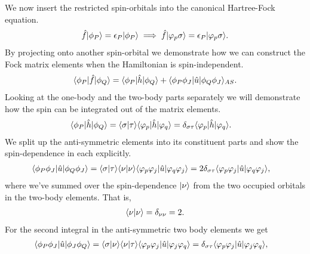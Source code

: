             We now insert the restricted spin-orbitals into the canonical
            Hartree-Fock equation.
            \begin{align}
                \hat{f}| \phi_P \rangle = \epsilon_P| \phi_P \rangle
                \implies
                \hat{f}| \varphi_p\sigma \rangle
                = \epsilon_P| \varphi_p\sigma \rangle.
            \end{align}
            By projecting onto another spin-orbital we demonstrate how we can
            construct the Fock matrix elements when the Hamiltonian is
            spin-independent.
            \begin{align}
                \langle \phi_P |\hat{f}| \phi_Q \rangle
                = \langle \phi_P |\hat{h}| \phi_Q \rangle
                + \langle \phi_P\phi_J |\hat{u}| \phi_Q\phi_J \rangle_{AS}.
                \label{eq:mo-fock-elements}
            \end{align}
            Looking at the one-body and the two-body parts separately we will
            demonstrate how the spin can be integrated out of the matrix
            elements.
            \begin{align}
                \langle \phi_P |\hat{h}| \phi_Q \rangle
                &= \langle \sigma | \tau \rangle\langle \varphi_p |\hat{h}| \varphi_q \rangle
                = \delta_{\sigma\tau}\langle \varphi_p |\hat{h}| \varphi_q \rangle.
            \end{align}
            We split up the anti-symmetric elements into its constituent parts
            and show the spin-dependence in each explicitly.
            \begin{align}
                \langle \phi_P\phi_J |\hat{u}| \phi_Q\phi_J \rangle
                &= \langle \sigma | \tau \rangle\langle \nu | \nu \rangle
                \langle \varphi_p\varphi_j |\hat{u}| \varphi_q\varphi_j \rangle
                = 2 \delta_{\sigma\tau}
                \langle \varphi_p\varphi_j |\hat{u}| \varphi_q\varphi_j \rangle,
            \end{align}
            where we've summed over the spin-dependence $| \nu \rangle$ from the two
            occupied orbitals in the two-body elements.
            That is,
            \begin{align}
                \langle \nu | \nu \rangle = \delta_{\nu\nu} = 2.
            \end{align}
            For the second integral in the anti-symmetric two body elements we
            get
            \begin{align}
                \langle \phi_P\phi_J |\hat{u}| \phi_J\phi_Q \rangle
                &= \langle \sigma | \nu \rangle\langle \nu | \tau \rangle
                \langle \varphi_p\varphi_j |\hat{u}| \varphi_j\varphi_q \rangle
                = \delta_{\sigma\tau}
                \langle \varphi_p\varphi_j |\hat{u}| \varphi_j\varphi_q \rangle,
            \end{align}
